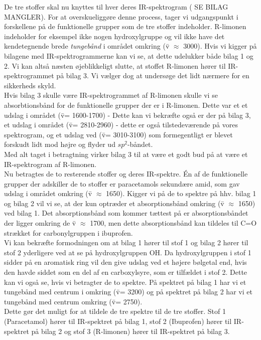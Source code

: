 De tre stoffer skal nu knyttes til hver deres IR-spektrogram ( SE BILAG MANGLER). For at overskueliggøre denne process, tager vi udgangspunkt i forskellene på de funktionelle grupper som de tre stoffer indeholder. R-limonen indeholder for eksempel ikke nogen hydroxylgruppe og vil ikke have det kendetegnende brede \emph{tungebånd} i området omkring (\={v} $\approx$ 3000). Hvis vi kigger på bilagene med IR-spektrogrammerne kan vi se, at dette udelukker både bilag 1 og 2. Vi kan altså næsten øjeblikkeligt slutte, at stoffet R-limonen hører til IR-spektrogrammet på bilag 3. Vi vælger dog at undersøge det lidt nærmere for en sikkerheds skyld. 
\\

Hvis bilag 3 skulle være IR-spektrogrammet af R-limonen skulle vi se absorbtionsbånd for de funktionelle grupper der er i R-limonen. Dette var  et et udslag i området (\={v}= 1600-1700) - Dette kan vi bekræfte også er der på bilag 3, et udslag i området (\={v}= 2810-2960) - dette er også tilstedeværende på vores spektrogram, og et udslag ved (\={v}= 3010-3100) som formegentligt er blevet forskudt lidt mod højre og flyder ud $sp^2$-båndet.
\\

Med alt taget i betragtning virker bilag 3 til at være et godt bud på at være et IR-spektrogram af R-limonen.
\\

Nu betragtes de to resterende stoffer og deres IR-spektre. Én af de funktionelle grupper der adskiller de to stoffer er paracetamols sekundære amid, som gav udslag i området omkring (\={v} $\approx$ 1650). Kigger vi på de to spektre på hhv. bilag 1 og bilag 2 vil vi se, at der kun optræder et absorptionsbånd omkring (\={v} $\approx$ 1650) ved bilag 1. Det absorptionsbånd som kommer tættest på er absorptionsbåndet der ligger omkring de \={v} $\approx$ 1700, men dette absorptionsbånd kan tildeles til C=O strækket for carbonylgruppen i ibuprofen.
\\
Vi kan bekræfte formodningen om at bilag 1 hører til stof 1 og bilag 2 hører til stof 2 yderligere ved at se på hydroxylgruppen OH. Da hydroxylgruppen i stof 1 sidder på en aromatisk ring vil den give udslag ved et højere bølgetal end, hvis den havde siddet som en del af en carboxylsyre, som er tilfældet i stof 2. Dette kan vi også se, hvis vi betragter de to spektre. På spektret på bilag 1 har vi et tungebånd med centrum i omkring (\={v}= 3200) og på spektret på bilag 2 har vi et tungebånd med centrum omkring (\={v}= 2750).
\\

Dette gør det muligt for at tildele de tre spektre til de tre stoffer. Stof 1 (Paracetamol) hører til IR-spektret på bilag 1, stof 2 (Ibuprofen) hører til IR-spektret på bilag 2 og stof 3 (R-limonen) hører til IR-spektret på bilag 3.
